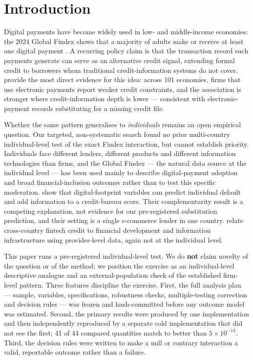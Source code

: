 \section{Introduction}

Digital payments have become widely used in low- and middle-income economies: the 2024
Global Findex shows that a majority of adults make or receive at least one digital payment
\citep{KlapperSingerStaritaNorris2025}. A recurring policy claim is that the transaction
record such payments generate can serve as an alternative credit signal, extending formal
credit to borrowers whom traditional credit-information systems do not cover.
\citet{GalileaFaraziMare2026} provide the most direct evidence for this idea: across 101
economies, firms that use electronic payments report weaker credit constraints, and the
association is stronger where credit-information depth is lower --- consistent with
electronic-payment records substituting for a missing credit file.

Whether the same pattern generalises to \emph{individuals} remains an open empirical
question. Our targeted, non-systematic search found no prior multi-country individual-level
test of the exact Findex interaction, but cannot establish priority. Individuals face
different lenders, different products and different information technologies than firms, and
the Global Findex --- the natural data source at the individual level --- has been used
mainly to describe digital-payment adoption and broad financial-inclusion outcomes rather
than to test this specific moderation. \citet{BergBurgGombovicPuri2020} show that
digital-footprint variables can predict individual default and add information to a
credit-bureau score. Their complementarity result is a competing explanation, not evidence
for our pre-registered substitution prediction, and their setting is a single e-commerce
lender in one country. \citet{BazarbashBeaton2020} relate cross-country fintech credit to
financial development and information infrastructure using provider-level data, again not at
the individual level.

This paper runs a pre-registered individual-level test. We do \textbf{not} claim novelty of
the question or of the method; we position the exercise as an individual-level descriptive
analogue and an external-population check of the established firm-level pattern. Three
features discipline the exercise. First, the full analysis plan --- sample, variables,
specifications, robustness checks, multiple-testing correction and decision rules --- was
frozen and hash-committed before any outcome model was estimated. Second, the primary
results were produced by one implementation and then independently reproduced by a separate
cold implementation that did not see the first; 41 of 44 compared quantities match to better
than $5\times10^{-13}$. Third, the decision rules were written to make a null or contrary
interaction a valid, reportable outcome rather than a failure.

